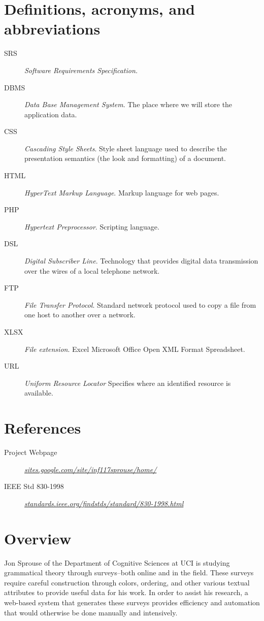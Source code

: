\documentclass[a4paper,12pt,oneside]{report}
\begin{document}
\section{Definitions, acronyms, and abbreviations}
\begin{description}
\item[SRS] \emph{Software Requirements Specification.}
\item[DBMS] \emph{Data Base Management System}. The place where we will store the application data.
\item[CSS] \emph{Cascading Style Sheets}. Style sheet language used to describe the presentation semantics (the look and formatting) of a document.
\item[HTML] \emph{HyperText Markup Language}. Markup language for web pages.
\item[PHP] \emph{Hypertext Preprocessor}. Scripting language.
\item[DSL] \emph{Digital Subscriber Line}. Technology that provides digital data transmission over the wires of a local telephone network.
\item[FTP] \emph{File Transfer Protocol}. Standard network protocol used to copy a file from one host to another over a network.
\item[XLSX] \emph{File extension}. Excel Microsoft Office Open XML Format Spreadsheet.
\item[URL] \emph{Uniform Resource Locator} Specifies where an identified resource is available.
\end{description}

\section{References}
\begin{description}
\item [Project Webpage] {\it \url{  sites.google.com/site/inf117sprouse/home/}}
\item [IEEE Std 830-1998] {\it \url{ standards.ieee.org/findstds/standard/830-1998.html}}
\end{description}

\section{Overview}
Jon Sprouse of the Department of Cognitive Sciences at UCI is studying grammatical theory through surveys--both online and in the field. These surveys require careful construction through colors, ordering, and other various textual attributes to provide useful data for his work. In order to assist his research, a web-based system that generates these surveys provides efficiency and automation that would otherwise be done manually and intensively.
\end{document}
